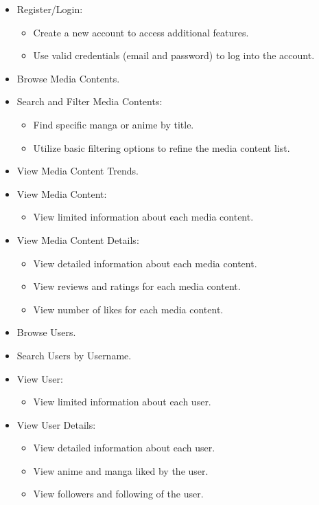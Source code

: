 \begin{itemize}
    \item Register/Login:
    \begin{itemize}
        \item Create a new account to access additional features.
        \item Use valid credentials (email and password) to log into the account.
    \end{itemize}
    \item Browse Media Contents.
    \item Search and Filter Media Contents:
    \begin{itemize}
        \item Find specific manga or anime by title.
        \item Utilize basic filtering options to refine the media content list.
    \end{itemize}
    \item View Media Content Trends.
    \item View Media Content:
    \begin{itemize}
        \item View limited information about each media content.
    \end{itemize} 
    \item View Media Content Details:
    \begin{itemize}
        \item View detailed information about each media content.
        \item View reviews and ratings for each media content.
        \item View number of likes for each media content.
    \end{itemize}
    \item Browse Users.
    \item Search Users by Username.
    \item View User:
    \begin{itemize}
        \item View limited information about each user.
    \end{itemize} 
    \item View User Details:
    \begin{itemize}
        \item View detailed information about each user.
        \item View anime and manga liked by the user.
        \item View followers and following of the user.
    \end{itemize}
\end{itemize}


